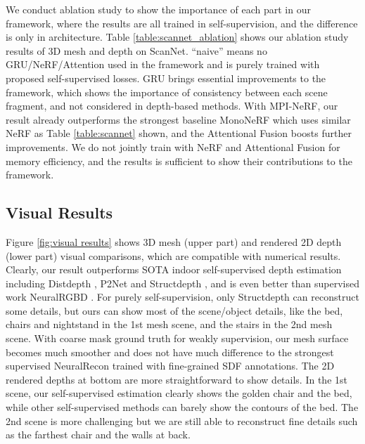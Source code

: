 \vspace{-2mm}
\quad We conduct ablation study to show the importance of each part in our framework, where the results are all trained in self-supervision, and the difference is only in architecture. Table \ref{table:scannet_ablation} shows our ablation study results of 3D mesh and depth on ScanNet. ``naive'' means no GRU/NeRF/Attention used in the framework and is purely trained with proposed self-supervised losses. GRU brings essential improvements to the framework, which shows the importance of consistency between each scene fragment, and not considered in depth-based methods. With MPI-NeRF, our result already outperforms the strongest baseline MonoNeRF \cite{mononerf} which uses similar NeRF as Table \ref{table:scannet} shown, and the Attentional Fusion boosts further improvements. We do not jointly train with NeRF and Attentional Fusion for memory efficiency, and the results is sufficient to show their contributions to the framework. 



\subsection{Visual Results}
\vspace{-2mm}

\quad Figure \ref{fig:visual results} shows 3D mesh (upper part) and rendered 2D depth (lower part) visual comparisons, which are compatible with numerical results. Clearly, our result outperforms SOTA indoor self-supervised depth estimation including Distdepth \cite{distdepth}, P2Net \cite{p2net} and Structdepth \cite{structdepth}, and is even better than supervised work NeuralRGBD \cite{neuralrgb}. For purely self-supervision, only Structdepth can reconstruct some details, but ours can show most of the scene/object details, like the bed, chairs and nightstand in the 1st mesh scene, and the stairs in the 2nd mesh scene. With coarse mask ground truth for weakly supervision, our mesh surface becomes much smoother and does not have much difference to the strongest supervised NeuralRecon trained with fine-grained SDF annotations. The 2D rendered depths at bottom are more straightforward to show details. In the 1st scene, our self-supervised estimation clearly shows the golden chair and the bed, while other self-supervised methods can barely show the contours of the bed. The 2nd scene is more challenging but we are still able to reconstruct fine details such as the farthest chair and the walls at back.





